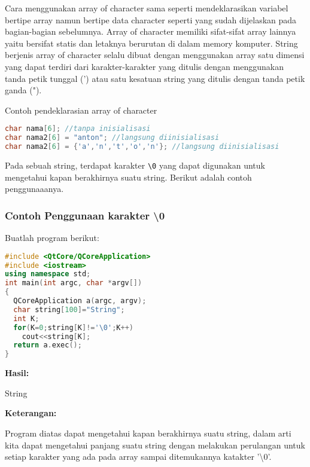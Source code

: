 Cara menggunakan array of character sama seperti mendeklarasikan
variabel bertipe array namun bertipe data character seperti yang sudah
dijelaskan pada bagian-bagian sebelumnya. Array of character memiliki
sifat-sifat array lainnya yaitu bersifat statis dan letaknya berurutan
di dalam memory komputer. String berjenis array of character selalu
dibuat dengan menggunakan array satu dimensi yang dapat terdiri dari
karakter-karakter yang ditulis dengan menggunakan tanda petik tunggal
(') atau satu kesatuan string yang ditulis dengan tanda petik ganda
(").

Contoh pendeklarasian array of character

\begin{lstlisting}[language=c++, numbers=none]
char nama[6]; //tanpa inisialisasi
char nama2[6] = "anton"; //langsung diinisialisasi
char nama2[6] = {'a','n','t','o','n'}; //langsung diinisialisasi
\end{lstlisting}

Pada sebuah string, terdapat karakter \texttt{\textbackslash{}0} yang
dapat digunakan untuk mengetahui kapan berakhirnya suatu string. Berikut
adalah contoh penggunaaanya.

\subsubsection*{Contoh  Penggunaan karakter \textbackslash{0}}

Buatlah program berikut:

\begin{lstlisting}[language=c++, caption=Penggunaan karakter \textbackslash{0}, label=contoh3-14]
#include <QtCore/QCoreApplication>
#include <iostream>
using namespace std;
int main(int argc, char *argv[])
{
  QCoreApplication a(argc, argv);
  char string[100]="String";
  int K;
  for(K=0;string[K]!='\0';K++)
    cout<<string[K];
  return a.exec();
}
\end{lstlisting}

\textbf{Hasil:}

\begin{lcverbatim}
String
\end{lcverbatim}

\textbf{Keterangan:}

Program diatas dapat mengetahui kapan berakhirnya suatu string, dalam
arti kita dapat mengetahui panjang suatu string dengan melakukan
perulangan untuk setiap karakter yang ada pada array sampai ditemukannya
katakter '\textbackslash0'.

